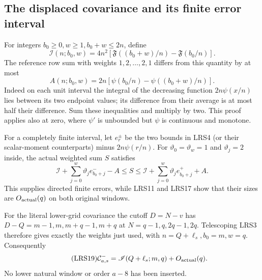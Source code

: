 \documentclass[11pt,a4paper]{article}
\begin{document}
\subsection{The displaced covariance and its finite error interval}

For integers $b_0\ge0,w\ge1,b_0+w\le2n$, define
\[
 \mathscr I(n;b_0,w)=4n^2\left[
 \mathfrak F((b_0+w)/n)-\mathfrak F(b_0/n)\right].
\]
The reference row sum with weights $1,2,\ldots,2,1$ differs from this
quantity by at most
\begin{equation}\tag{LRS17}
 A(n;b_0,w)=2n[\psi(b_0/n)-\psi((b_0+w)/n)].
\end{equation}
Indeed on each unit interval the integral of the decreasing function
$2n\psi(x/n)$ lies between its two endpoint values; its difference
from their average is at most half their difference.  Sum these
inequalities and multiply by two.  This proof applies also at zero,
where $\psi'$ is unbounded but $\psi$ is continuous and monotone.

For a completely finite interval, let $e_r^\pm$ be the two bounds in
LRS4 (or their scalar-moment counterparts) minus $2n\psi(r/n)$.
For $\vartheta_0=\vartheta_w=1$ and $\vartheta_j=2$ inside, the
actual weighted sum $S$ satisfies
\begin{equation}\tag{LRS18}
 \mathscr I+\sum_{j=0}^w\vartheta_je_{b_0+j}^--A
 \le S\le
 \mathscr I+\sum_{j=0}^w\vartheta_je_{b_0+j}^++A.
\end{equation}
This supplies directed finite errors, while LRS11 and LRS17 show
that their sizes are $O_{\rm actual}(q)$ on both original windows.

For the literal lower-grid covariance the cutoff $D=N-v$ has
$D-Q=m-1,m,m+q-1,m+q$ at $N=q-1,q,2q-1,2q$.
Telescoping LRS3 therefore gives exactly the weights just used, with
$n=Q+\ell_s,b_0=m,w=q$.  Consequently
\begin{equation}\tag{LRS19}
 \mathcal C^-_{a,s}=\mathscr I(Q+\ell_s;m,q)+O_{\rm actual}(q).
\end{equation}
No lower natural window or order $a-8$ has been inserted.
\end{document}
